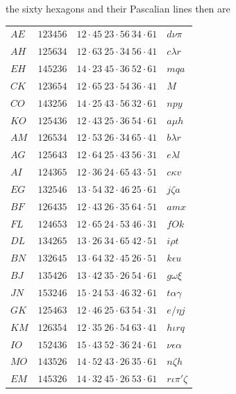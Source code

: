 \documentclass[11pt,a4paper]{article}
\theoremstyle{definition}
\begin{document}
\newpage

the sixty hexagons and their Pascalian lines then are
\begin{center}
\small
\begin{tabular}{llll}
$AE$ & $123456$ & $12 \cdot 45\ 23 \cdot 56\ 34 \cdot 61$ & $d\nu\pi$\\
$AH$ & $125634$ & $12 \cdot 63\ 25 \cdot 34\ 56 \cdot 41$ & $c\lambda r$\\
$EH$ & $145236$ & $14 \cdot 23\ 45 \cdot 36\ 52 \cdot 61$ & $mqa$\\
$CK$ & $123654$ & $12 \cdot 65\ 23 \cdot 54\ 36 \cdot 41$ & $M$\\
$CO$ & $143256$ & $14 \cdot 25\ 43 \cdot 56\ 32 \cdot 61$ & $npy$\\
$KO$ & $125436$ & $12 \cdot 43\ 25 \cdot 36\ 54 \cdot 61$ & $a\mu h$\\
$AM$ & $126534$ & $12 \cdot 53\ 26 \cdot 34\ 65 \cdot 41$ & $b\lambda r$\\
$AG$ & $125643$ & $12 \cdot 64\ 25 \cdot 43\ 56 \cdot 31$ & $e\lambda l$\\
$AI$ & $124365$ & $12 \cdot 36\ 24 \cdot 65\ 43 \cdot 51$ & $c\kappa v$\\
$EG$ & $132546$ & $13 \cdot 54\ 32 \cdot 46\ 25 \cdot 61$ & $j\zeta a$\\
$BF$ & $126435$ & $12 \cdot 43\ 26 \cdot 35\ 64 \cdot 51$ & $amx$\\
$FL$ & $124653$ & $12 \cdot 65\ 24 \cdot 53\ 46 \cdot 31$ & $fOk$\\
$DL$ & $134265$ & $13 \cdot 26\ 34 \cdot 65\ 42 \cdot 51$ & $i\rho t$\\
$BN$ & $132645$ & $13 \cdot 64\ 32 \cdot 45\ 26 \cdot 51$ & $k\epsilon u$\\
$BJ$ & $135426$ & $13 \cdot 42\ 35 \cdot 26\ 54 \cdot 61$ & $g\omega\xi$\\
$JN$ & $153246$ & $15 \cdot 24\ 53 \cdot 46\ 32 \cdot 61$ & $t\alpha\gamma$\\
$GK$ & $125463$ & $12 \cdot 46\ 25 \cdot 63\ 54 \cdot 31$ & $e/\eta j$\\
$KM$ & $126354$ & $12 \cdot 35\ 26 \cdot 54\ 63 \cdot 41$ & $h\iota rq$\\
$IO$ & $152436$ & $15 \cdot 43\ 52 \cdot 36\ 24 \cdot 61$ & $\nu\epsilon\alpha$\\
$MO$ & $143526$ & $14 \cdot 52\ 43 \cdot 26\ 35 \cdot 61$ & $n\zeta h$\\
$EM$ & $145326$ & $14 \cdot 32\ 45 \cdot 26\ 53 \cdot 61$ & $r\iota\pi'\zeta$\\

\end{tabular}
\end{center}
\end{document}
